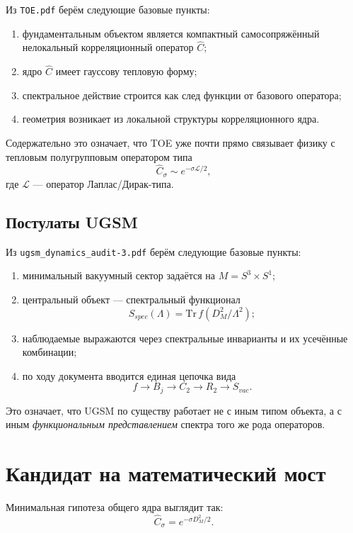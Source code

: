 \documentclass[12pt,a4paper]{article}
\begin{document}
Из \texttt{TOE.pdf} берём следующие базовые пункты:
\begin{enumerate}
    \item фундаментальным объектом является компактный самосопряжённый нелокальный корреляционный оператор \(\hat C\);
    \item ядро \(\hat C\) имеет гауссову тепловую форму;
    \item спектральное действие строится как след функции от базового оператора;
    \item геометрия возникает из локальной структуры корреляционного ядра.
\end{enumerate}

Содержательно это означает, что TOE уже почти прямо связывает физику с тепловым полугрупповым оператором типа
\[
\hat C_\sigma \sim e^{-\sigma \mathcal{L}/2},
\]
где \(\mathcal{L}\) --- оператор Лаплас/Дирак-типа.

\subsection{Постулаты UGSM}

Из \texttt{ugsm\_dynamics\_audit-3.pdf} берём следующие базовые пункты:
\begin{enumerate}
    \item минимальный вакуумный сектор задаётся на \(M = S^3 \times S^1\);
    \item центральный объект --- спектральный функционал
    \[
    S_{spec}(\Lambda)=\mathrm{Tr}\, f(D_M^2/\Lambda^2);
    \]
    \item наблюдаемые выражаются через спектральные инварианты и их усечённые комбинации;
    \item по ходу документа вводится единая цепочка вида
    \[
    f \to B_j \to C_2 \to R_2 \to S_{vac}.
    \]
\end{enumerate}

Это означает, что UGSM по существу работает не с иным типом объекта, а с иным \emph{функциональным представлением} спектра того же рода операторов.

\section{Кандидат на математический мост}

Минимальная гипотеза общего ядра выглядит так:
\begin{equation}
\hat C_\sigma = e^{-\sigma D_M^2/2}.
\end{equation}
\end{document}
